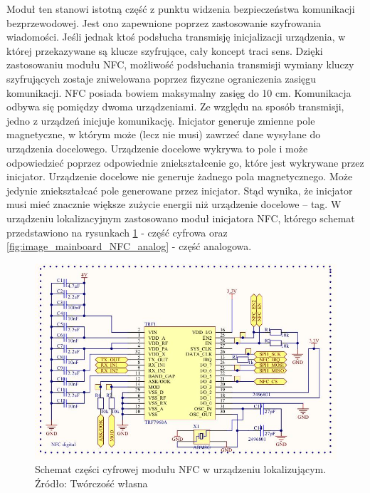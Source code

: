 Moduł ten stanowi istotną część z punktu widzenia bezpieczeństwa komunikacji bezprzewodowej. Jest ono zapewnione poprzez zastosowanie szyfrowania wiadomości. Jeśli jednak ktoś podsłucha transmisję inicjalizacji urządzenia, w której przekazywane są klucze szyfrujące, cały koncept traci sens. Dzięki zastosowaniu modułu NFC, możliwość podsłuchania transmisji wymiany kluczy szyfrujących zostaje zniwelowana poprzez fizyczne ograniczenia zasięgu komunikacji. NFC posiada bowiem maksymalny zasięg do 10 cm.
Komunikacja odbywa się pomiędzy dwoma urządzeniami. Ze względu na sposób transmisji, jedno z urządzeń inicjuje komunikację. Inicjator generuje zmienne pole magnetyczne, w którym może (lecz nie musi) zawrzeć dane wysyłane do urządzenia docelowego. Urządzenie docelowe wykrywa to pole i może odpowiedzieć poprzez odpowiednie zniekształcenie go, które jest wykrywane przez inicjator. Urządzenie docelowe nie generuje żadnego pola magnetycznego. Może jedynie zniekształcać pole generowane przez inicjator. Stąd wynika, że inicjator musi mieć znacznie większe zużycie energii niż urządzenie docelowe – tag. W urządzeniu lokalizacyjnym zastosowano moduł inicjatora NFC, którego schemat przedstawiono na rysunkach \ref{fig:image_mainboard_NFC_digital} - część cyfrowa oraz \ref{fig:image_mainboard_NFC_analog} - część analogowa.

\begin{figure}[H]
	\centering
	\includegraphics[width=15cm]{img/schematics/mainboard_NFC_chip.jpg}
	\caption{Schemat części cyfrowej modułu NFC w urządzeniu lokalizującym. \\ Źródło: Twórczość własna}
	\label{fig:image_mainboard_NFC_digital}
\end{figure}

